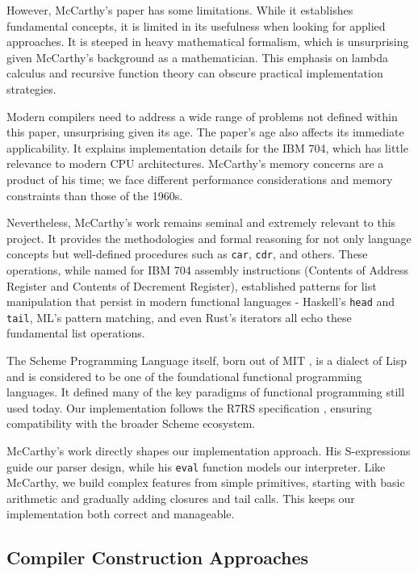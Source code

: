 \documentclass[final]{cmpreport_02}
\begin{document}
However, McCarthy's paper has some limitations. While it establishes fundamental concepts, it is limited in its usefulness when looking for applied approaches. It is steeped in heavy mathematical formalism, which is unsurprising given McCarthy's background as a mathematician. This emphasis on lambda calculus and recursive function theory can obscure practical implementation strategies.

Modern compilers need to address a wide range of problems not defined within this paper, unsurprising given its age. The paper's age also affects its immediate applicability. It explains implementation details for the IBM 704, which has little relevance to modern CPU architectures. McCarthy's memory concerns are a product of his time; we face different performance considerations and memory constraints than those of the 1960s.

Nevertheless, McCarthy's work remains seminal and extremely relevant to this project. It provides the methodologies and formal reasoning for not only language concepts but well-defined procedures such as \texttt{car}, \texttt{cdr}, and others. These operations, while named for IBM 704 assembly instructions (Contents of Address Register and Contents of Decrement Register), established patterns for list manipulation that persist in modern functional languages - Haskell's \texttt{head} and \texttt{tail}, ML's pattern matching, and even Rust's iterators all echo these fundamental list operations.

The Scheme Programming Language itself, born out of MIT \cite{SchemeInterpMIT}, is a dialect of Lisp \cite{structureandinterp} and is considered to be one of the foundational functional programming languages. It defined many of the key paradigms of functional programming still used today. Our implementation follows the R7RS specification \cite{r7rs}, ensuring compatibility with the broader Scheme ecosystem.

McCarthy's work directly shapes our implementation approach. His S-expressions guide our parser design, while his \texttt{eval} function models our interpreter. Like McCarthy, we build complex features from simple primitives, starting with basic arithmetic and gradually adding closures and tail calls. This keeps our implementation both correct and manageable.

\subsection{Compiler Construction Approaches}
\end{document}
